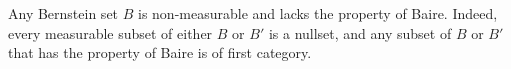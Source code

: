 Any Bernstein set $B$ is non-measurable and lacks the property of Baire. Indeed, every measurable subset of either $B$ or $B'$ is a nullset, and any subset of $B$ or $B'$ that has the property of Baire is of first category.
